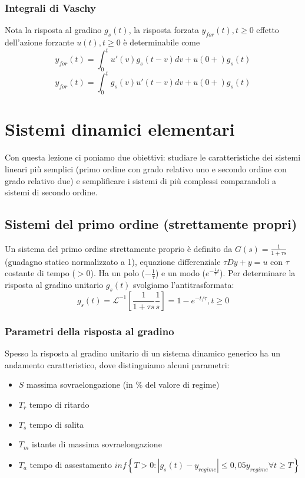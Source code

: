 \documentclass[11pt]{article}
\begin{document}
\subsubsection{Integrali di Vaschy}
Nota la risposta al gradino $g_s(t)$, la risposta forzata $y_{for} (t), t\ge0$ effetto dell'azione forzante $u(t), t\ge0$ è determinabile come 
\begin{displaymath}
    y_{for}(t) = \int_0^t u' (v) g_s(t-v) dv + u(0+)g_s(t)
\end{displaymath}
\begin{displaymath}
    y_{for}(t) = \int_0^t  g_s(v) u'(t-v) dv + u(0+)g_s(t)
\end{displaymath}
\section{Sistemi dinamici elementari}
Con questa lezione ci poniamo due obiettivi: studiare le caratteristiche dei sistemi lineari più semplici (primo ordine con grado relativo uno e secondo ordine con grado relativo due) e semplificare i sistemi di più complessi comparandoli a sistemi di secondo ordine. 
\subsection{Sistemi del primo ordine (strettamente propri)}
Un sistema del primo ordine strettamente proprio è definito da $G(s)=\frac{1}{1+\tau s}$ (guadagno statico normalizzato a 1), equazione differenziale $\tau Dy + y = u$ con $\tau$ costante di tempo ($>0$). Ha un polo ($-\frac{1}{\tau}$) e un modo ($e^{-\frac{1}{\tau}t}$). Per determinare la risposta al gradino unitario $g_s(t)$ svolgiamo l'antitrasformata:
\begin{displaymath}
    g_s(t) = \mathcal{L}^{-1}\left[\frac{1}{1+\tau s}\frac{1}{s}\right] = 1 - e^{-t/\tau}, t\ge0
\end{displaymath}
\subsubsection{Parametri della risposta al gradino}
Spesso la risposta al gradino unitario di un sistema dinamico generico ha un andamento caratteristico, dove distinguiamo alcuni parametri:
\begin{itemize}
    \item $S$ massima sovraelongazione (in \% del valore di regime)
    \item $T_r$ tempo di ritardo
    \item $T_s$ tempo di salita
    \item $T_m$ istante di massima sovraelongazione 
    \item $T_a$ tempo di assestamento $inf\left\{T>0: |g_s(t)-y_{regime}|\le 0,05 y_{regime} \forall t \ge T\right\}$
\end{itemize}
\end{document}
